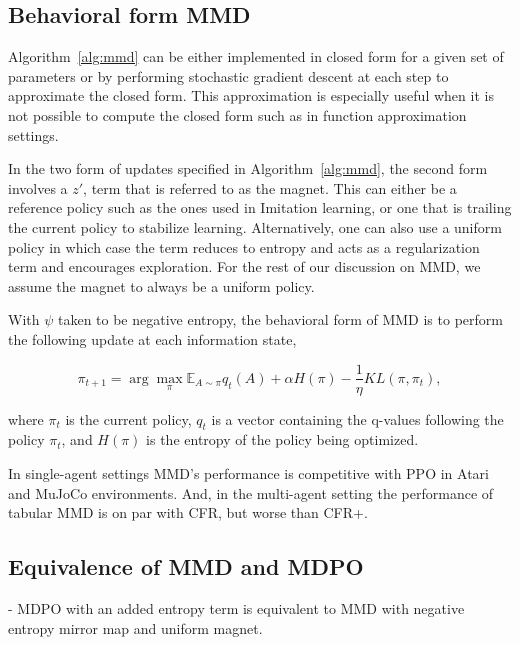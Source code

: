 \subsection{Behavioral form MMD}

Algorithm~\ref{alg:mmd} can be either implemented in closed form for a given set of parameters or
by performing stochastic gradient descent at each step to approximate the closed form.
This approximation is especially useful when it is not possible to compute the closed form such as
in function approximation settings.

In the two form of updates specified in Algorithm~\ref{alg:mmd}, the second form involves a $z'$,
term that is referred to as the magnet.
This can either be a reference policy such as the ones used in Imitation learning, or one that is
trailing the current policy to stabilize learning.
Alternatively, one can also use a uniform policy in which case the term reduces to entropy and acts
as a regularization term and encourages exploration.
For the rest of our discussion on MMD, we assume the magnet to always be a uniform policy.

With $\psi$ taken to be negative entropy, the behavioral form of MMD is to perform the following
update at each information state,

\begin{equation}
	\label{eqn:mmdbf} \pi_{t+1}
	= \arg \max_{\pi} \mathbb{E}_{A \sim \pi} q_t(A) + \alpha H(\pi) - \frac{1}{\eta} KL(\pi, \pi_t),
\end{equation}

where $\pi_t$ is the current policy, $q_t$ is a vector
containing the q-values following the policy $\pi_t$, and $H(\pi)$ is the entropy of the policy
being optimized.





In single-agent settings MMD's performance is competitive with PPO in Atari and MuJoCo
environments.
And, in the multi-agent setting the performance of tabular MMD is on par with CFR, but worse than
CFR+.

\subsection{Equivalence of MMD and MDPO}

- MDPO with an added entropy term is equivalent to MMD with negative entropy mirror map and
uniform magnet.